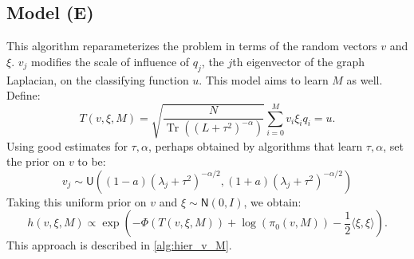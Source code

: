 \documentclass{siamart1116}
\DeclareMathOperator{\Tr}{Tr}
\begin{document}
    \subsection{Model (E)} \label{sec:algorithms_model_e}
        This algorithm reparameterizes the problem in terms of the random vectors $v$ and $\xi$. $v_j$ modifies the scale of influence of $q_j$, the $j$th eigenvector of the graph Laplacian, on the classifying function $u$. This model aims to learn $M$ as well. Define:
        \begin{equation}
        T(v,\xi,M) = \sqrt{\frac{N}{\Tr ((L + \tau^2)^{-\alpha}) }} \sum_{i=0}^{M} v_i\xi_iq_i = u.
        \end{equation}
        Using good estimates for $\tau, \alpha$, perhaps obtained by algorithms that learn $\tau, \alpha$, set the prior on $v$ to be:
        \[v_j \sim \mathsf{U}\left((1-a)(\lambda_j+\tau^2)^{-\alpha/2},(1+a)(\lambda_j+\tau^2)^{-\alpha/2}\right)\]
        Taking this uniform prior on $v$ and $\xi \sim \mathsf{N}(0, I)$, we obtain:
        \begin{equation}
        \label{eqn:learn_v_M_posterior}
        h(v, \xi, M) \propto \exp \left(-\Phi(T(v,\xi, M)) + \log (\pi_0(v, M)) - \frac{1}{2}\langle \xi, \xi \rangle  \right).
        \end{equation}
        This approach is described in \cref{alg:hier_v_M}.
\end{document}
